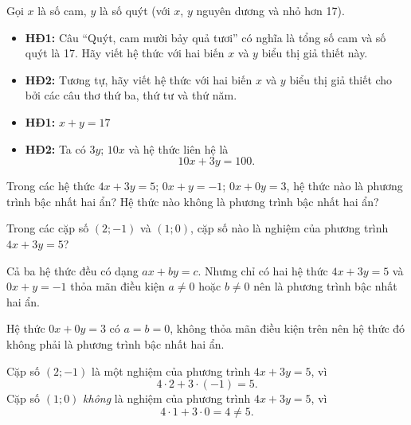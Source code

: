 \begin{ttkp}
    Gọi $x$ là số cam, $y$ là số quýt (với $x$, $y$ nguyên dương và nhỏ hơn 17).
    \begin{itemize}
        \item \textbf{HĐ1:} Câu ``Quýt, cam mười bảy quả tươi'' có nghĩa là tổng số cam và số quýt là 17. Hãy viết hệ thức với hai biến $x$ và $y$ biểu thị giả thiết này.
        \item \textbf{HĐ2:} Tương tự, hãy viết hệ thức với hai biến $x$ và $y$ biểu thị giả thiết cho bởi các câu thơ thứ ba, thứ tư và thứ năm.
    \end{itemize}
    \doicot
    \begin{itemize}
        \item \textbf{HĐ1:} $x+y=17$
        \item \textbf{HĐ2:} Ta có $3y$; $10x$ và hệ thức liên hệ là $$10x+3y=100.$$
    \end{itemize}
\end{ttkp}

\begin{vidu}
    \begin{listEX}
        \item Trong các hệ thức $4x + 3y = 5$; $0x + y = -1$; $0x + 0y = 3$, hệ thức nào là phương trình bậc nhất hai ẩn? Hệ thức nào không là phương trình bậc nhất hai ẩn?
        \item Trong các cặp số $(2; -1)$ và $(1; 0)$, cặp số nào là nghiệm của phương trình $4x + 3y = 5$?
    \end{listEX}
    \doicot
    \begin{listEX}
        \item Cả ba hệ thức đều có dạng $ax + by = c$. Nhưng chỉ có hai hệ thức $4x + 3y = 5$ và $0x + y = -1$ thỏa mãn điều kiện $a \neq 0$ hoặc $b \neq 0$ nên là phương trình bậc nhất hai ẩn.
        
        Hệ thức $0x + 0y = 3$ có $a = b = 0$, không thỏa mãn điều kiện trên nên hệ thức đó không phải là phương trình bậc nhất hai ẩn.
        
        \item Cặp số $(2; -1)$ là một nghiệm của phương trình $4x + 3y = 5$, vì
        \[ 4 \cdot 2 + 3 \cdot (-1) = 5. \]
        Cặp số $(1; 0)$ \textit{không} là nghiệm của phương trình $4x + 3y = 5$, vì
        \[ 4 \cdot 1 + 3 \cdot 0 = 4 \neq 5. \]
    \end{listEX}
\end{vidu}

